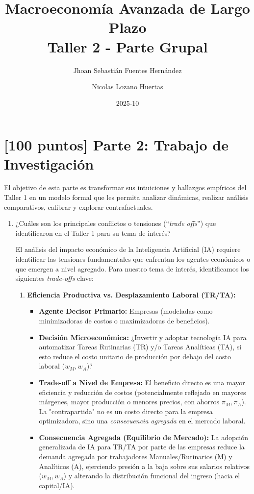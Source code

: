 \documentclass{article}
\title{\textbf{Macroeconom\'ia Avanzada de Largo Plazo} \\ \textbf{Taller 2 - Parte Grupal}}
\author{Jhoan Sebasti\'an Fuentes Hern\'andez \and Nicolas Lozano Huertas}
\date{2025-10}
\theoremstyle{remark}
\theoremstyle{definition}
\begin{document}
\maketitle
\vspace{-1 cm}
\section*{[100 puntos] Parte 2: Trabajo de Investigación}

\noindent El objetivo de esta parte es transformar sus intuiciones y hallazgos empíricos del Taller 1 en un modelo formal que les permita analizar dinámicas, realizar análisis comparativos, calibrar y explorar contrafactuales.

\begin{enumerate}
    \item ¿Cuáles son los principales conflictos o tensiones (``\emph{trade offs}'') que identificaron en el Taller 1 para su tema de interés? \\
        \begin{tcolorbox}[title= Solución Punto 1 (Revisado - Versión Preferida)]

El análisis del impacto económico de la Inteligencia Artificial (IA) requiere identificar las tensiones fundamentales que enfrentan los agentes económicos o que emergen a nivel agregado. Para nuestro tema de interés, identificamos los siguientes \textit{trade-offs} clave:

\begin{enumerate}
    \item \textbf{Eficiencia Productiva vs. Desplazamiento Laboral (TR/TA):}
        \begin{itemize}
            \item \textbf{Agente Decisor Primario:} Empresas (modeladas como minimizadoras de costos o maximizadoras de beneficios).
            \item \textbf{Decisión Microeconómica:} ¿Invertir y adoptar tecnología IA para automatizar Tareas Rutinarias (TR) y/o Tareas Analíticas (TA), si esto reduce el costo unitario de producción por debajo del costo laboral ($w_M, w_A$)?
            \item \textbf{Trade-off a Nivel de Empresa:} El beneficio directo es una mayor eficiencia y reducción de costos (potencialmente reflejado en mayores márgenes, mayor producción o menores precios, con ahorros $\pi_M, \pi_A$). La "contrapartida" no es un costo directo para la empresa optimizadora, sino una \textit{consecuencia agregada} en el mercado laboral.
            \item \textbf{Consecuencia Agregada (Equilibrio de Mercado):} La adopción generalizada de IA para TR/TA por parte de las empresas reduce la demanda agregada por trabajadores Manuales/Rutinarios (M) y Analíticos (A), ejerciendo presión a la baja sobre sus salarios relativos ($w_M, w_A$) y alterando la distribución funcional del ingreso (hacia el capital/IA).
        \end{itemize}
        \vspace{0.5em} %


\end{enumerate}
\end{tcolorbox}
\end{enumerate}
\end{document}
